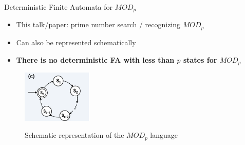 \documentclass[aspectratio=169,9pt]{beamer}
\begin{document}
\begin{frame}[t]{Deterministic Finite Automata for $MOD_p$}
  \begin{itemize}
    \item This talk/paper: prime number search / recognizing $MOD_p$  
    \item Can also be represented schematically
    \item \textbf{There is no deterministic FA with less than $p$ states for $MOD_p$}
  \end{itemize}
  \vspace*{2em}
  \begin{figure}
    \centering
      \includegraphics[width=0.3\textwidth]{QFA_MODn.png}\\
      \caption*{Schematic representation of the $MOD_p$ language}
  \end{figure}
\end{frame}
\end{document}
